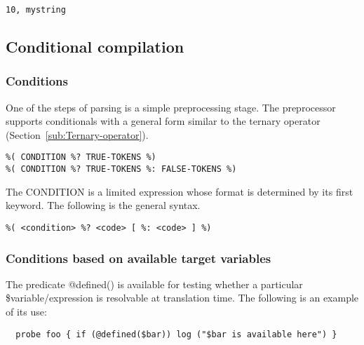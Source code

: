 \documentclass[twoside,english]{article}
\newenvironment{vindent}
{\begin{list}{}{\setlength{\listparindent}{6pt}}
\item[]}
{\end{list}}
\begin{document}
\begin{vindent}
\begin{verbatim}
10, mystring
\end{verbatim}
\end{vindent}


\subsection{Conditional compilation}


\subsubsection{Conditions}
One of the steps of parsing is a simple preprocessing stage.  The
preprocessor supports conditionals with a general form similar to the
ternary operator (Section~\ref{sub:Ternary-operator}).

\begin{vindent}
\begin{verbatim}
%( CONDITION %? TRUE-TOKENS %)
%( CONDITION %? TRUE-TOKENS %: FALSE-TOKENS %)
\end{verbatim}
\end{vindent}
The CONDITION is a limited expression whose format is determined by its first
keyword. The following is the general syntax.

\begin{vindent}
\begin{verbatim}
%( <condition> %? <code> [ %: <code> ] %)
\end{verbatim}
\end{vindent}

\subsubsection{Conditions based on available target variables}
The predicate @defined() is available for testing whether a
particular \$variable/expression is resolvable at translation time. The
following is an example of its use:

\begin{vindent}
\begin{verbatim}
  probe foo { if (@defined($bar)) log ("$bar is available here") }
\end{verbatim}
\end{vindent}
\end{document}
